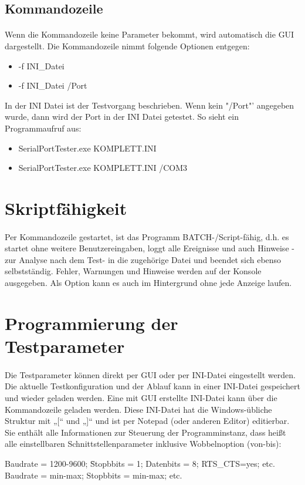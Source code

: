 \subsection{Kommandozeile}
\paragraph{}
Wenn die Kommandozeile keine Parameter bekommt, wird automatisch die GUI dargestellt. Die Kommandozeile nimmt folgende Optionen entgegen:
\begin{itemize}
\item -f INI\_Datei
\item -f INI\_Datei /Port
\end{itemize} 
In der INI Datei ist der Testvorgang beschrieben. Wenn kein "/Port"' angegeben wurde, dann wird der Port in der INI Datei getestet. So sieht ein Programmaufruf aus:
\begin{itemize}
\item SerialPortTester.exe KOMPLETT.INI
\item SerialPortTester.exe KOMPLETT.INI /COM3 
\end{itemize} 

\section{Skriptfähigkeit}
\paragraph{}
Per Kommandozeile gestartet, ist das Programm BATCH-/Script-fähig, d.h. es startet ohne weitere Benutzereingaben, loggt alle Ereignisse und auch Hinweise -zur Analyse nach dem Test- in die zugehörige Datei und beendet sich ebenso selbstständig. Fehler, Warnungen und Hinweise werden auf der Konsole ausgegeben. Als Option kann es auch im Hintergrund ohne jede Anzeige laufen.


\section{Programmierung der Testparameter}
\paragraph{}
Die Testparameter können direkt per GUI oder per INI-Datei eingestellt werden. Die aktuelle Testkonfiguration und der Ablauf kann in einer INI-Datei gespeichert und wieder geladen werden. Eine mit GUI erstellte INI-Datei kann über die Kommandozeile geladen werden. Diese INI-Datei hat die Windows-übliche Struktur mit „[“ und „]“ und ist per Notepad (oder anderen Editor) editierbar.
\\
Sie enthält alle Informationen zur Steuerung der Programminstanz, dass heißt alle einstellbaren Schnittstellenparameter inklusive Wobbelnoption (von-bis):
\begin{tabbing}
\hspace*{10mm}Baudrate = 1200-9600; \=Stopbbits = 1; Datenbits = 8; RTS\_CTS=yes; etc.
\\
\hspace*{10mm}Baudrate = min-max; \>Stopbbits = min-max; etc.
\end{tabbing}

